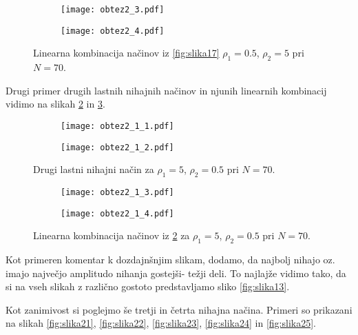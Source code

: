 \documentclass[12pt,a4paper]{article}
\begin{document}
\begin{figure}[H]
    \centering
    \begin{subfigure}[b]{0.4\textwidth}
        \texttt{[image: obtez2\_3.pdf]}
    \end{subfigure}
    \begin{subfigure}[b]{0.4\textwidth}
        \texttt{[image: obtez2\_4.pdf]}
    \end{subfigure}
    \caption{Linearna kombinacija načinov iz \ref{fig:slika17} $\rho_1= 0.5$, $\rho_2=5$ pri $N=70$.} \label{fig:slika18}
\end{figure}

\noindent Drugi primer drugih lastnih nihajnih načinov in njunih linearnih kombinacij vidimo na slikah \ref{fig:slika19} in \ref{fig:slika20}.

\begin{figure}[H]
    \centering
    \begin{subfigure}[b]{0.49\textwidth}
        \texttt{[image: obtez2\_1\_1.pdf]}
    \end{subfigure}
    \begin{subfigure}[b]{0.49\textwidth}
        \texttt{[image: obtez2\_1\_2.pdf]}
    \end{subfigure}
    \caption{Drugi lastni nihajni način za $\rho_1= 5$, $\rho_2=0.5$ pri $N=70$.} \label{fig:slika19}
\end{figure}

\begin{figure}[H]
    \centering
    \begin{subfigure}[b]{0.49\textwidth}
        \texttt{[image: obtez2\_1\_3.pdf]}
    \end{subfigure}
    \begin{subfigure}[b]{0.49\textwidth}
        \texttt{[image: obtez2\_1\_4.pdf]}
    \end{subfigure}
    \caption{Linearna kombinacija načinov iz \ref{fig:slika19} za $\rho_1= 5$, $\rho_2=0.5$ pri $N=70$.} \label{fig:slika20}
\end{figure}

\noindent Kot primeren komentar k dozdajnšnjim slikam, dodamo, da najbolj nihajo oz. imajo največjo amplitudo nihanja gostejši- težji deli. To najlajže vidimo tako, da si na vseh slikah z različno gostoto predstavljamo sliko \ref{fig:slika13}.

Kot zanimivost si poglejmo še tretji in četrta nihajna načina. Primeri so prikazani na slikah \ref{fig:slika21}, \ref{fig:slika22}, \ref{fig:slika23}, \ref{fig:slika24} in \ref{fig:slika25}.
\end{document}
